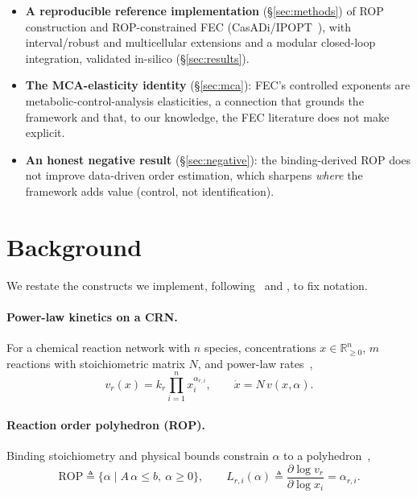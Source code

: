 \documentclass[11pt]{article}
\newcommand{\rop}{\mathrm{ROP}}
\newcommand{\real}{\mathbb{R}}
\begin{document}
\begin{itemize}
\item[\textbf{C1}] \textbf{A reproducible reference implementation}
(\S\ref{sec:methods}) of ROP construction and ROP-constrained FEC
(CasADi/IPOPT~\citep{andersson2019casadi,wachter2006ipopt}), with interval/robust
and multicellular extensions and a modular closed-loop integration, validated
in-silico (\S\ref{sec:results}).
\item[\textbf{C2}] \textbf{The MCA-elasticity identity} (\S\ref{sec:mca}): FEC's
controlled exponents are metabolic-control-analysis elasticities, a connection
that grounds the framework and that, to our knowledge, the FEC literature does
not make explicit.
\item[\textbf{C3}] \textbf{An honest negative result} (\S\ref{sec:negative}):
the binding-derived ROP does not improve data-driven order estimation, which
sharpens \emph{where} the framework adds value (control, not identification).
\end{itemize}

\section{Background}\label{sec:background}

We restate the constructs we implement, following~\citet{xiao2023fec} and
\citet{xiao2022thesis}, to fix notation.

\paragraph{Power-law kinetics on a CRN.} For a chemical reaction network with $n$
species, concentrations $x\in\real^n_{\ge 0}$, $m$ reactions with stoichiometric
matrix $N$, and power-law rates~\citep{feinberg2019crnt,alon2019systems},
\begin{equation}
v_r(x) = k_r \prod_{i=1}^{n} x_i^{\alpha_{r,i}}, \qquad \dot{x} = N\,v(x,\alpha).
\label{eq:powerlaw}
\end{equation}

\paragraph{Reaction order polyhedron (ROP).} Binding stoichiometry and
physical bounds constrain $\alpha$ to a polyhedron~\citep{xiao2022thesis},
\begin{equation}
\rop \triangleq \bigl\{ \alpha \;\big|\; A\,\alpha \le b,\ \alpha \ge 0 \bigr\},
\qquad
L_{r,i}(\alpha) \triangleq \frac{\partial \log v_r}{\partial \log x_i} = \alpha_{r,i}.
\label{eq:rop}
\end{equation}
\end{document}

